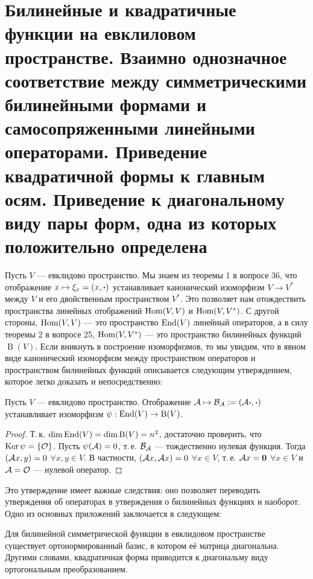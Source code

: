 \section{Билинейные и квадратичные функции на евклиловом пространстве. Взаимно однозначное
соответствие между симметрическими билинейными формами и самосопряженными
линейными операторами. Приведение квадратичной формы к главным осям. Приведение к
диагональному виду пары форм, одна из которых положительно определена}

Пусть $V$ --- евклидово пространство. Мы знаем из теоремы 1 в вопросе 36, что отображение $x \mapsto \xi_x = (x, \boldsymbol{\cdot})$ устанавливает канонический изоморфизм $V \to V^\ast$ между $V$ и его двойственным пространством $V^\ast$. Это позволяет нам отождествить пространства линейных отображений $\operatorname{Hom}(V, V)$ и $\operatorname{Hom}(V, V^\ast)$. С другой стороны, $\operatorname{Hom}(V ,V)$ --- это пространство $\operatorname{End}(V)$ линейный операторов, а в силу теоремы 2 в вопросе 25, $\operatorname{Hom}(V, V^\ast)$ --- это пространство билинейных функций $\operatorname{B}(V)$. Если вникнуть в построение изоморфизмов, то мы увидим, что в явном виде канонический изоморфизм между пространством операторов и пространством билинейных функций описывается следующим утверждением, которое легко доказать и непосредственно:

\begin{proposal}
    Пусть $V$ --- евклидово пространство. Отображение $\mathcal{A} \mapsto \mathcal{B}_{\mathcal{A}} \vcentcolon = (\mathcal{A}\boldsymbol{\cdot}, \boldsymbol{\cdot})$ устанавливает изоморфизм $\psi: \operatorname{End}(V) \to \operatorname{B}(V)$.
\end{proposal}

\begin{proof}
    Т.\,к. $\dim\operatorname{End}(V) = \dim\operatorname{B}(V) = n^2$, достаточно проверить, что $\operatorname{Ker}\psi = \{\mathcal{O}\}$. Пусть $\psi(\mathcal{A}) = 0$, т.\,е. $\mathcal{B}_{\mathcal{A}}$ --- тождественно нулевая функция. Тогда $(\mathcal{A} x, y) = 0$ $\forall x, y \in V$. В частности, $(\mathcal{A} x, \mathcal{A} x) = 0$ $\forall x \in V$, т.\,е. $\mathcal{A} x = \boldsymbol{0}$ $\forall x \in V$ и $\mathcal{A} = \mathcal{O}$ --- нулевой оператор.
\end{proof}

Это утверждение имеет важные следствия: оно позволяет переводить утверждения об операторах в утверждения о билинейных функциях и наоборот. Одно из основных приложений заключается в следующем:

\begin{theorem}
    Для билинейной симметрической функции в евклидовом пространстве существует ортонормированный базис, в котором её матрица диагональна. Другими словами, квадратичная форма приводится к диагональму виду ортогональным преобразованием.
\end{theorem}

